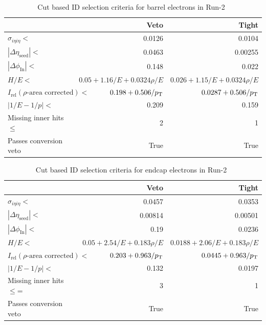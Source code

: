 \begin{table}[htb!]
	\centering
	\caption[Cut based ID selection criteria for barrel electrons in Run-2~\cite{electronid}]{Cut based ID selection criteria for barrel electrons in Run-2~\cite{electronid}}
	\label{tab:electron_barrel}
	\begin{tabular}{l | r | r}
		\hline
		& Veto & Tight \\
		\hline
		\hline
		$\sigma_{i\eta i\eta}<$ & 0.0126 & 0.0104 \\
		$|\Delta\eta_\text{seed}|<$ & 0.0463 & 0.00255 \\
		$|\Delta\phi_\text{In}|<$ & 0.148 & 0.022 \\
		$H/E<$ & $0.05+1.16/E+0.0324\rho/E$ & $0.026+1.15/E+0.0324\rho/E$ \\
		$I_\text{rel}(\rho\text{-area corrected})<$ & $0.198+0.506/p_\mathrm{T}$ & $0.0287+0.506/p_\mathrm{T}$\\
		$|1/E-1/p|<$  & 0.209 & 0.159 \\
		Missing inner hits $\leq$ & 2 & 1 \\
		Passes conversion veto & True & True\\
		\hline
	\end{tabular}
\end{table}

\begin{table}[htb!]
	\centering
	\caption[Cut based ID selection criteria for endcap electrons in Run-2~\cite{electronid}]{Cut based ID selection criteria for endcap electrons in Run-2~\cite{electronid}}
	\label{tab:electron_endcap}
	\begin{tabular}{l | r | r}
		\hline
		& Veto & Tight \\
		\hline
		\hline
		$\sigma_{i\eta i\eta}<$ & 0.0457 & 0.0353 \\
		$|\Delta\eta_\text{seed}|<$ & 0.00814 & 0.00501 \\
		$|\Delta\phi_\text{In}|<$ & 0.19 & 0.0236 \\
		$H/E<$ & $0.05+2.54/E+0.183\rho/E$ & $0.0188+2.06/E+0.183\rho/E$ \\
		$I_\text{rel}(\rho\text{-area corrected})<$ & $0.203+0.963/p_\mathrm{T}$ & $0.0445+0.963/p_\mathrm{T}$\\
		$|1/E-1/p|<$ & 0.132 & 0.0197 \\
		Missing inner hits $\leq$= & 3 & 1 \\
		Passes conversion veto & True & True\\
		\hline
	\end{tabular}
\end{table}

